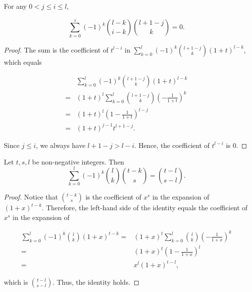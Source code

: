 \documentclass[11pt]{article}
\begin{document}
\begin{identity}
    \label{Identity:alt-binom-prod-sum}
    For any \(0 < j\leq i\leq l\),

    \[
    \sum_{k = 0}^i(-1)^k\binom{l-k}{i-k}\binom{l+1-j}{k} = 0.
    \]
    
\end{identity}

\begin{proof}

    The sum is the coefficient of \(t^{l-i}\) in \(\sum\limits_{k = 0}^{l}(-1)^k\binom{l+1-j}{k}(1+t)^{l-k}\), which equals
    
    \begin{align*}
     &\sum_{k = 0}^l(-1)^k\binom{l+1-j}{k}(1+t)^{l-k}\\
     =& (1+t)^{l}\sum_{k = 0}^l\binom{l+1-j}{k}(-\frac{1}{1+t})^k\\ 
     =& (1+t)^{l}(1-\frac{1}{1+t})^{l-j}\\ 
     =& (1+t)^{j-1}t^{l+1-j}. 
    \end{align*}
    
    Since $j\leq i$, we always have $l+1-j > l-i$. Hence, the coefficient of $t^{l-i}$ is 0. 
\end{proof}

\begin{identity}\label{Identity:shifted-binom-diff}
    Let \(t, s, l\) be non-negative integers. Then 
    \[
    \sum_{k = 0}^l(-1)^k\binom{l}{k}\binom{t - k}{s} = \binom{t - l}{s - l}.
    \]
\end{identity}

\begin{proof}

    Notice that \(\binom{t - k}{s}\) is the coefficient of \(x^s\) in the expansion of \((1 + x)^{t - k}\). Therefore, the left-hand side of the identity equals the coefficient of \(x^s\) in the expansion of 
    
    \begin{align*}
        \sum_{k = 0}^{l}(-1)^k\binom{l}{k}(1 + x)^{t - k}=&(1 + x)^t\sum_{k = 0}^l\binom{l}{k}(-\frac{1}{1 + x})^k\\ 
        =&(1 + x)^t(1 - \frac{1}{1+x})^l\\ 
        =&x^l(1 + x)^{t - l},
    \end{align*}
    
    which is \(\binom{t - l}{s - l}\). Thus, the identity holds. 
    
\end{proof}
\end{document}
